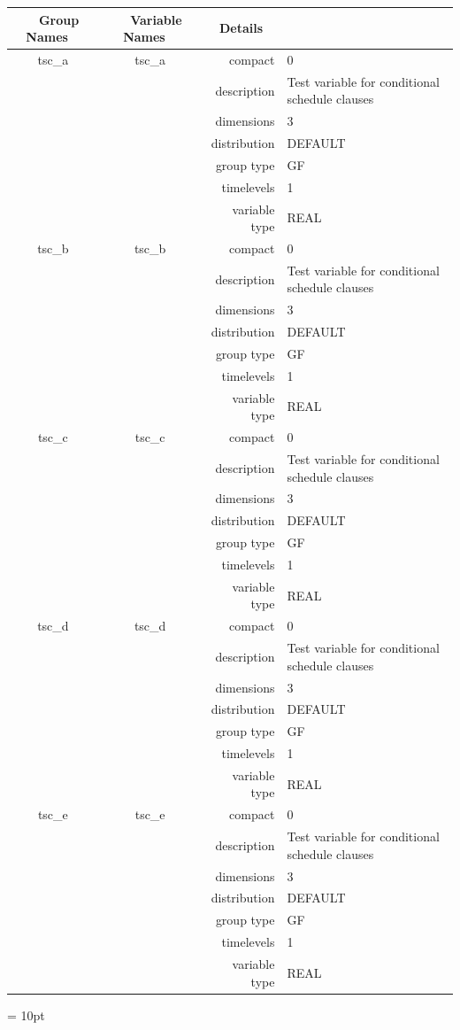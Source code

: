 \begin{tabular*}{150mm}{|c|c@{\extracolsep{\fill}}|rl|} \hline 
~ {\bf Group Names} ~ & ~ {\bf Variable Names} ~  &{\bf Details} ~ & ~\\ 
\hline 
tsc\_a & tsc\_a & compact & 0 \\ 
 &  & description & Test variable for conditional schedule clauses \\ 
 &  & dimensions & 3 \\ 
 &  & distribution & DEFAULT \\ 
 &  & group type & GF \\ 
 &  & timelevels & 1 \\ 
 &  & variable type & REAL \\ 
\hline 
tsc\_b & tsc\_b & compact & 0 \\ 
 &  & description & Test variable for conditional schedule clauses \\ 
 &  & dimensions & 3 \\ 
 &  & distribution & DEFAULT \\ 
 &  & group type & GF \\ 
 &  & timelevels & 1 \\ 
 &  & variable type & REAL \\ 
\hline 
tsc\_c & tsc\_c & compact & 0 \\ 
 &  & description & Test variable for conditional schedule clauses \\ 
 &  & dimensions & 3 \\ 
 &  & distribution & DEFAULT \\ 
 &  & group type & GF \\ 
 &  & timelevels & 1 \\ 
 &  & variable type & REAL \\ 
\hline 
tsc\_d & tsc\_d & compact & 0 \\ 
 &  & description & Test variable for conditional schedule clauses \\ 
 &  & dimensions & 3 \\ 
 &  & distribution & DEFAULT \\ 
 &  & group type & GF \\ 
 &  & timelevels & 1 \\ 
 &  & variable type & REAL \\ 
\hline 
tsc\_e & tsc\_e & compact & 0 \\ 
 &  & description & Test variable for conditional schedule clauses \\ 
 &  & dimensions & 3 \\ 
 &  & distribution & DEFAULT \\ 
 &  & group type & GF \\ 
 &  & timelevels & 1 \\ 
 &  & variable type & REAL \\ 
\hline 
\end{tabular*} 



\vspace{5mm}\parskip = 10pt 
